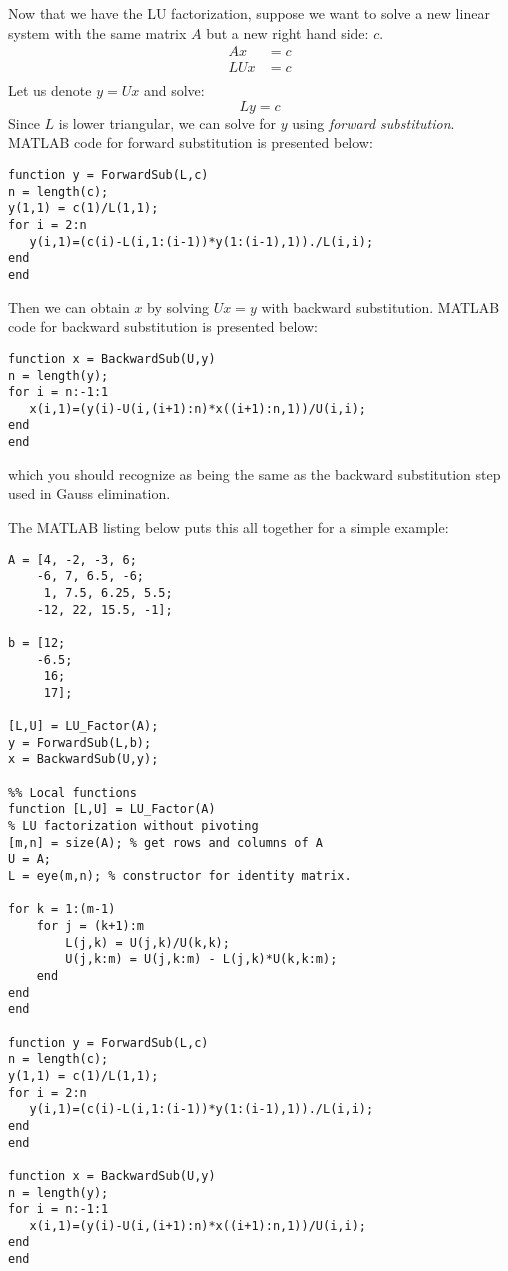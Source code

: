 Now that we have the LU factorization, suppose we want to solve a new linear system with the same matrix $A$ but a new right hand side: $c$.
\begin{align*}
Ax &= c \\
LUx &= c \\
\end{align*}
Let us denote $y = Ux$ and solve:
\begin{equation*}
Ly = c
\end{equation*}
Since $L$ is lower triangular, we can solve for $y$ using \emph{forward substitution}.  MATLAB code for forward substitution is presented below:
\begin{lstlisting}[style=myMatlab]
function y = ForwardSub(L,c)
n = length(c);
y(1,1) = c(1)/L(1,1);
for i = 2:n
   y(i,1)=(c(i)-L(i,1:(i-1))*y(1:(i-1),1))./L(i,i); 
end
end
\end{lstlisting}
Then we can obtain $x$ by solving $Ux = y$ with backward substitution.  MATLAB code for backward substitution is presented below:
\begin{lstlisting}[style=myMatlab]
function x = BackwardSub(U,y)
n = length(y);
for i = n:-1:1
   x(i,1)=(y(i)-U(i,(i+1):n)*x((i+1):n,1))/U(i,i); 
end
end
\end{lstlisting}
which you should recognize as being the same as the backward substitution step used in Gauss elimination.

The MATLAB listing below puts this all together for a simple example:
\begin{lstlisting}[style=myMatlab]
A = [4, -2, -3, 6;
    -6, 7, 6.5, -6;
     1, 7.5, 6.25, 5.5;
    -12, 22, 15.5, -1];
        
b = [12;
    -6.5;
     16;
     17];

[L,U] = LU_Factor(A);
y = ForwardSub(L,b);
x = BackwardSub(U,y);

%% Local functions
function [L,U] = LU_Factor(A)
% LU factorization without pivoting
[m,n] = size(A); % get rows and columns of A
U = A;
L = eye(m,n); % constructor for identity matrix.

for k = 1:(m-1)
    for j = (k+1):m
        L(j,k) = U(j,k)/U(k,k);
        U(j,k:m) = U(j,k:m) - L(j,k)*U(k,k:m);
    end
end
end

function y = ForwardSub(L,c)
n = length(c);
y(1,1) = c(1)/L(1,1);
for i = 2:n
   y(i,1)=(c(i)-L(i,1:(i-1))*y(1:(i-1),1))./L(i,i); 
end
end

function x = BackwardSub(U,y)
n = length(y);
for i = n:-1:1
   x(i,1)=(y(i)-U(i,(i+1):n)*x((i+1):n,1))/U(i,i); 
end
end
\end{lstlisting}
